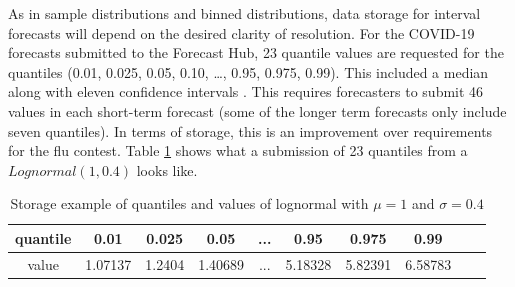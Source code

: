 \documentclass[11pt,notitlepage]{isuthesis}
\begin{document}
As in sample distributions and binned distributions, 
data storage for interval forecasts will
depend on the desired clarity of resolution. For the COVID-19 forecasts 
submitted to the Forecast Hub, 23 quantile values are requested for 
the quantiles (0.01, 0.025, 0.05, 0.10, …, 0.95, 0.975, 0.99). This included a 
median along with eleven confidence intervals \cite{bracher2021evaluating}. This
requires forecasters to submit 46 values in each short-term forecast 
(some of the longer term forecasts only include seven quantiles). In terms of 
storage, this is an improvement over requirements for the flu contest. Table
\ref{table:qstor} shows what a submission of 23 quantiles from a 
$Lognormal(1,0.4)$ looks like.



\begin{table}[h!]
\centering

 \begin{tabular}{|c||c|c|c|c|c|c|c|c|c|}
 \hline
    quantile & 0.01 & 0.025 & 0.05  & ...  & 0.95 & 0.975 & 0.99 \\ \hline
    value & 1.07137 & 1.2404 & 1.40689 & ... & 5.18328 &
    5.82391 & 6.58783 \\
    
 \hline
 \end{tabular}
 \caption[Quantile/interval and values storage]{Storage example of quantiles 
 and values of lognormal with $\mu = 1$ and $\sigma = 0.4$}
 \label{table:qstor}
\end{table}
\end{document}
